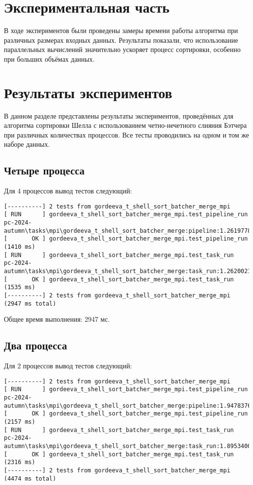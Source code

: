 \documentclass[a4paper,12pt]{article}
\begin{document}
\section{Экспериментальная часть}
В ходе экспериментов были проведены замеры времени работы алгоритма при различных размерах входных данных. Результаты показали, что использование параллельных вычислений значительно ускоряет процесс сортировки, особенно при больших объёмах данных.

\section{Результаты экспериментов}

В данном разделе представлены результаты экспериментов, проведённых для алгоритма сортировки Шелла с использованием четно-нечетного слияния Бэтчера при различных количествах процессов. Все тесты проводились на одном и том же наборе данных.

\subsection{Четыре процесса}
Для 4 процессов вывод тестов следующий:
\begin{verbatim}
[----------] 2 tests from gordeeva_t_shell_sort_batcher_merge_mpi
[ RUN      ] gordeeva_t_shell_sort_batcher_merge_mpi.test_pipeline_run
pc-2024-autumn\tasks\mpi\gordeeva_t_shell_sort_batcher_merge:pipeline:1.2619778000
[       OK ] gordeeva_t_shell_sort_batcher_merge_mpi.test_pipeline_run (1410 ms)
[ RUN      ] gordeeva_t_shell_sort_batcher_merge_mpi.test_task_run
pc-2024-autumn\tasks\mpi\gordeeva_t_shell_sort_batcher_merge:task_run:1.2620021000
[       OK ] gordeeva_t_shell_sort_batcher_merge_mpi.test_task_run (1535 ms)
[----------] 2 tests from gordeeva_t_shell_sort_batcher_merge_mpi (2947 ms total)
\end{verbatim}

Общее время выполнения: 2947 мс.

\subsection{Два процесса}
Для 2 процессов вывод тестов следующий:
\begin{verbatim}
[----------] 2 tests from gordeeva_t_shell_sort_batcher_merge_mpi
[ RUN      ] gordeeva_t_shell_sort_batcher_merge_mpi.test_pipeline_run
pc-2024-autumn\tasks\mpi\gordeeva_t_shell_sort_batcher_merge:pipeline:1.9478376000
[       OK ] gordeeva_t_shell_sort_batcher_merge_mpi.test_pipeline_run (2157 ms)
[ RUN      ] gordeeva_t_shell_sort_batcher_merge_mpi.test_task_run
pc-2024-autumn\tasks\mpi\gordeeva_t_shell_sort_batcher_merge:task_run:1.8953400000
[       OK ] gordeeva_t_shell_sort_batcher_merge_mpi.test_task_run (2316 ms)
[----------] 2 tests from gordeeva_t_shell_sort_batcher_merge_mpi (4474 ms total)
\end{verbatim}
\end{document}
